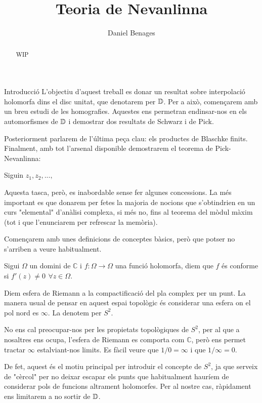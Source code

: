 \documentclass[dvipsnames, svgnames, leqno, a4paper, 12pt]{report}
\title{Teoria de Nevanlinna}
\date{}
\author{Daniel Benages}
\begin{document}
    \maketitle
    \begin{abstract}
        WIP
    \end{abstract}
    \begin{chapter}{Introducció}
        L'objectiu d'aquest treball es donar un resultat sobre interpolació holomorfa dins el disc unitat, que denotarem per \(\mathbb{D}\). Per a això, començarem amb un breu estudi de les homografies. Aquestes ens permetran endinsar-nos en els automorfismes de \(\mathbb{D}\) i demostrar dos resultats de Schwarz i de Pick.

        Posteriorment parlarem de l'última peça clau: els productes de Blaschke finits. Finalment, amb tot l'arsenal disponible demostrarem el teorema de Pick-Nevanlinna:
        \begin{theorem*}
            Siguin \(z_1,z_2,...,\) %
        \end{theorem*}

        Aquesta tasca, però,  es inabordable sense fer algunes concessions. La més important es que donarem per fetes la majoria de nocions que s'obtindrien en un curs "elemental" d'anàlisi complexa, si més no, fins al teorema del mòdul màxim (tot i que l'enunciarem per refrescar la memòria). 
        
        Començarem amb unes definicions de conceptes bàsics, però que potser no s'arriben a veure habitualment.
        \begin{definition} Sigui  \(\Omega\) un domini de \(\mathbb{C}\) i \(f: \Omega\to\Omega\) una funció holomorfa, diem que \(f\) és conforme si \(f'(z) \neq 0\,\  \forall z\in\Omega\).
        \end{definition}
        \begin{definition}
            Diem esfera de Riemann a la compactificació del pla complex per un punt. La manera usual de pensar en aquest espai topològic és considerar una esfera on el pol nord es \(\infty\). La denotem per \(S^2\).
        \end{definition}
        No ens cal preocupar-nos per les propietats topològiques de \(S^2\), per al que a nosaltres ens ocupa, l'esfera de Riemann es comporta com \(\mathbb{C}\), però ens permet tractar \(\infty\) estalviant-nos limits. Es fàcil veure que \(1/0 = \infty\) i que \(1/\infty = 0\).

        De fet, aquest és el motiu principal per introduir el concepte de \(S^2\), ja que serveix de "cèrcol" per no deixar escapar els punts que habitualment hauríem de considerar pols de funcions altrament holomorfes. Per al nostre cas, ràpidament ens limitarem a no sortir de \(\mathbb{D}\).

    \end{chapter}
\end{document}
